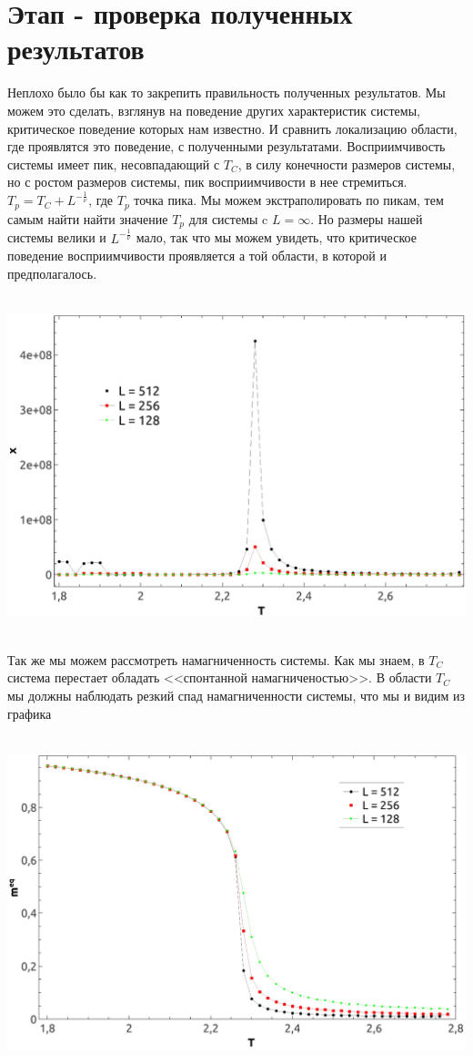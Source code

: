 \documentclass[12pt,a4paper]{article}
\begin{document}
	\section{Этап - проверка полученных результатов}
	Неплохо было бы как то закрепить правильность полученных результатов. Мы можем это сделать, взглянув на поведение
	других характеристик системы, критическое поведение которых нам известно. И сравнить локализацию области, где проявлятся это поведение, с полученными результатами.
	Восприимчивость системы имеет пик, несовпадающий с $T_C$, в силу конечности размеров системы, но с ростом размеров системы, пик восприимчивости в нее стремиться.
	$T_p = T_C + L^{-\frac{1}{\nu}}$, где $T_p$ точка пика.
	Мы можем экстраполировать по пикам, тем самым найти найти значение $T_p$ для системы c $L = \infty$. Но размеры нашей системы велики и $L^{-\frac{1}{\nu}}$ мало, так что мы можем увидеть, что критическое поведение восприимчивости проявляется а той области, в которой и предполагалось.
	\begin{center}
	\mbox{
		\includegraphics[scale=0.4]{chi}
	}
	\end{center} 
	Так же мы можем рассмотреть намагниченность системы.
	Как мы знаем, в $T_C$ система перестает обладать <<спонтанной намагниченостью>>. В области $T_C$ мы должны наблюдать резкий спад намагниченности системы, что мы и видим из графика
	\begin{center}
		\mbox{
			\includegraphics[scale=0.4]{meq}
		}
	\end{center}
\end{document}
